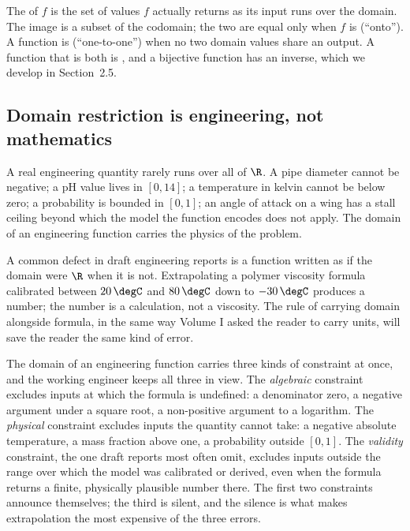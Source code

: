 The  of $f$ is the set of values $f$ actually returns
as its input runs over the domain. The image is a subset of the
codomain; the two are equal only when $f$ is 
(``onto''). A function is  (``one-to-one'') when
no two domain values share an output. A function that is both is
, and a bijective function has an inverse, which
we develop in Section~2.5.

\subsection{Domain restriction is engineering, not mathematics}

A real engineering quantity rarely runs over all of $\R$. A pipe
diameter cannot be negative; a pH value lives in $[0, 14]$; a
temperature in kelvin cannot be below zero; a probability is bounded
in $[0, 1]$; an angle of attack on a wing has a stall ceiling beyond
which the model the function encodes does not apply. The domain of an
engineering function carries the physics of the problem.

A common defect in draft engineering reports is a function written as
if the domain were $\R$ when it is not. Extrapolating a polymer
viscosity formula calibrated between $20\,\degC$ and $80\,\degC$ down
to $-30\,\degC$ produces a number; the number is a calculation, not a
viscosity. The rule of carrying domain alongside formula, in the
same way Volume I asked the reader to carry units, will save the
reader the same kind of error.

The domain of an engineering function carries three kinds of
constraint at once, and the working engineer keeps all three in view.
The \emph{algebraic} constraint excludes inputs at which the formula
is undefined: a denominator zero, a negative argument under a
square root, a non-positive argument to a logarithm. The
\emph{physical} constraint excludes inputs the quantity cannot take:
a negative absolute temperature, a mass fraction above one, a
probability outside $[0, 1]$. The \emph{validity} constraint, the one
draft reports most often omit, excludes inputs outside the range over
which the model was calibrated or derived, even when the formula
returns a finite, physically plausible number there. The first two
constraints announce themselves; the third is silent, and the silence
is what makes extrapolation the most expensive of the three errors.

